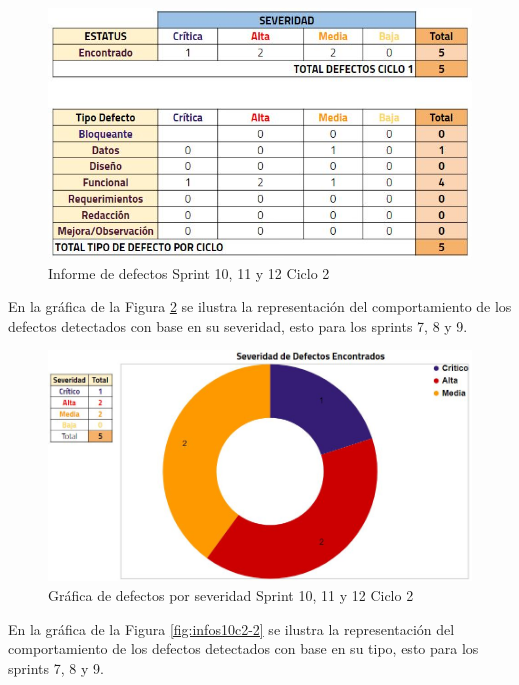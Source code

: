 \begin{figure}[H]
	\begin{center}
		\includegraphics[width=.95\textwidth]{images/pruebas/s10c2}
		\caption{Informe de defectos Sprint 10, 11 y 12  Ciclo 2}
		\label{fig:infos10c2}
	\end{center}
\end{figure}

En la gráfica de la Figura \ref{fig:infos10c2-1} se ilustra la representación del comportamiento de los defectos detectados con base en su severidad, esto para los sprints 7, 8 y 9.

\begin{figure}[H]
	\begin{center}
		\includegraphics[width=.75\textwidth]{images/pruebas/s10c2-1}
		\caption{Gráfica de defectos por severidad Sprint 10, 11 y 12  Ciclo 2}
		\label{fig:infos10c2-1}
	\end{center}
\end{figure}

En la gráfica de la Figura \ref{fig:infos10c2-2} se ilustra la representación del comportamiento de los defectos detectados con base en su tipo, esto para los sprints 7, 8 y 9.

